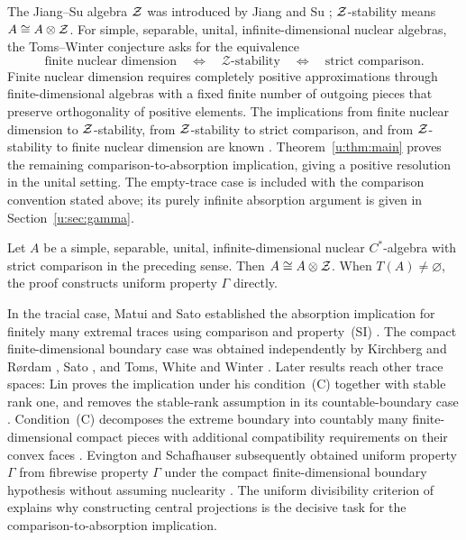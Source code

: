 The Jiang--Su algebra $\mathcal Z$ was introduced by Jiang and Su \cite{JS};
$\mathcal Z$-stability means $A\cong A\otimes\mathcal Z$. For simple, separable,
unital, infinite-dimensional nuclear algebras, the Toms--Winter
conjecture asks for the equivalence \cite[Conjecture~9.3]{WZNuc}
\[
 \text{finite nuclear dimension}
 \quad\Longleftrightarrow\quad
 \mathcal Z\text{-stability}
 \quad\Longleftrightarrow\quad
 \text{strict comparison}.
\]
Finite nuclear dimension requires completely positive approximations
through finite-dimensional algebras with a fixed finite number of
outgoing pieces that preserve orthogonality of positive elements.
The implications from finite nuclear dimension to $\mathcal Z$-stability,
from $\mathcal Z$-stability to strict comparison, and from $\mathcal Z$-stability to
finite nuclear dimension are known \cite{WinterNuc,Rordam,CETWW}.
Theorem~\ref{u:thm:main} proves the remaining comparison-to-absorption
implication, giving a positive resolution in the unital setting.
The empty-trace case is included with the comparison convention stated
above; its purely infinite absorption argument is given in
Section~\ref{u:sec:gamma}.

\begin{theorem}\label{u:thm:main}
Let $A$ be a simple, separable, unital, infinite-dimensional nuclear
$C^*$-algebra with strict comparison in the preceding sense.
Then $A\cong A\otimes\mathcal Z$. When $T(A)\ne\varnothing$, the proof constructs
uniform property $\Gamma$ directly.
\end{theorem}

In the tracial case, Matui and Sato established the absorption implication
for finitely many extremal traces using comparison and property~(SI)
\cite[Theorem~1.1]{MS}.
The compact finite-dimensional boundary case was obtained independently
by Kirchberg and R\o rdam \cite[Corollary~7.9]{KR14}, Sato
\cite[Corollary~1.2]{Sato12}, and Toms, White and Winter
\cite[Corollary~4.7]{TWW15}. Later results reach other trace spaces: Lin
proves the implication under his condition~(C) together with stable rank
one, and removes the stable-rank assumption in its countable-boundary case
\cite[Theorem~5.6 and Corollary~5.7]{Lin24}. Condition~(C) decomposes the
extreme boundary into countably many finite-dimensional compact pieces
with additional compatibility requirements on their convex faces
\cite[Definition~2.13]{Lin24}. Evington and Schafhauser subsequently
obtained uniform property $\Gamma$ from fibrewise property $\Gamma$
under the compact finite-dimensional boundary hypothesis without assuming
nuclearity \cite[Theorem~1.1]{EvingtonSchafhauser26}. The uniform divisibility criterion
of \cite[Theorem~5.6]{CETW} explains why constructing central projections
is the decisive task for the comparison-to-absorption implication.


